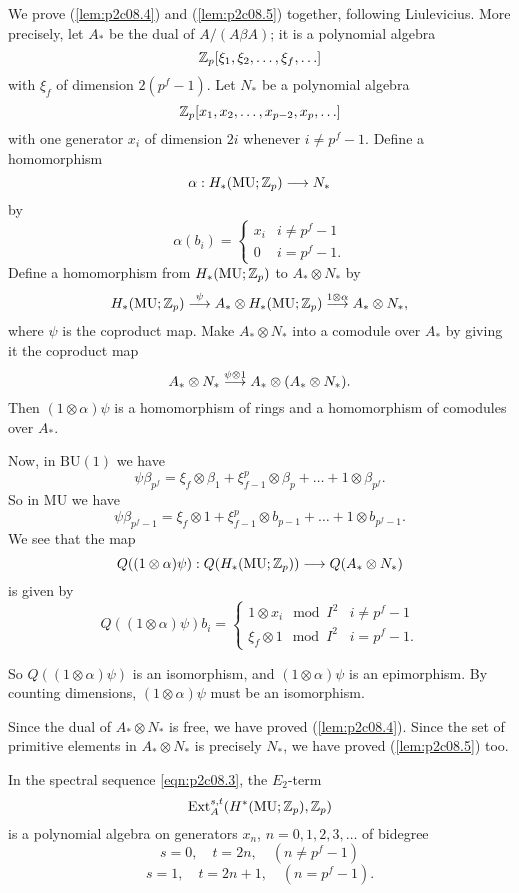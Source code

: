 \documentclass[../main]{subfiles}
\begin{document}
We prove (\ref{lem:p2c08.4}) and (\ref{lem:p2c08.5}) together, following Liulevicius. More precisely, let $A_\ast$ be the dual of $A/(A \beta A)$; it is a polynomial algebra $$\mathbb{Z}_p[\xi_1, \xi_2, \ldots, \xi_f, \ldots]$$ with $\xi_f$ of dimension $2(p^f - 1)$. Let $N_\ast$ be a polynomial algebra $$\mathbb{Z}_p[x_1, x_2, \ldots, x_{p - 2}, x_p, \ldots]$$ with one generator $x_i$ of dimension $2i$ whenever $i \ne p^f - 1$. Define a homomorphism $$\alpha : H_\ast(\mathrm{MU}; \mathbb{Z}_p) \overset{}{\longrightarrow} N_\ast$$ by $$\alpha(b_i) = \begin{cases}x_i & i \ne p^f - 1 \\ 0 & i = p^f - 1.\end{cases}$$ Define a homomorphism from $H_\ast(\mathrm{MU}; \mathbb{Z}_p)$ to $A_\ast \otimes N_\ast$ by $$H_\ast(\mathrm{MU}; \mathbb{Z}_p) \overset{\psi}{\longrightarrow} A_\ast \otimes H_\ast(\mathrm{MU}; \mathbb{Z}_p) \overset{1 \otimes \alpha}{\longrightarrow} A_\ast \otimes N_\ast,$$ where $\psi$ is the coproduct map. Make $A_\ast \otimes N_\ast$ into a comodule over $A_\ast$ by giving it the coproduct map $$A_\ast \otimes N_\ast \overset{\psi \otimes 1}{\longrightarrow} A_\ast \otimes (A_\ast \otimes N_\ast).$$ Then $(1 \otimes \alpha) \psi$ is a homomorphism of rings and a homomorphism of comodules over $A_\ast$.

Now, in $\mathrm{BU}(1)$ we have $$\psi \beta_{p^f} = \xi_f \otimes \beta_1 + \xi_{f-1}^p \otimes \beta_p + \ldots + 1 \otimes \beta_{p^f}.$$ So in $\mathrm{MU}$ we have $$\psi \beta_{p^f - 1} = \xi_f \otimes 1 + \xi_{f - 1}^p \otimes b_{p - 1} + \ldots + 1 \otimes b_{p^f - 1}.$$ We see that the map $$Q((1 \otimes \alpha) \psi) : Q(H_\ast(\mathrm{MU}; \mathbb{Z}_p)) \overset{}{\longrightarrow} Q(A_\ast \otimes N_\ast)$$ is given by $$Q((1 \otimes \alpha) \psi) b_i = \begin{cases}1 \otimes x_i \mod I^2 & i \ne p^f - 1 \\ \xi_f \otimes 1 \mod I^2 & i = p^f - 1.\end{cases}$$

So $Q((1 \otimes \alpha)\psi)$ is an isomorphism, and $(1 \otimes \alpha) \psi$ is an epimorphism. By counting dimensions, $(1 \otimes \alpha) \psi$ must be an isomorphism. 

Since the dual of $A_\ast \otimes N_\ast$ is free, we have proved (\ref{lem:p2c08.4}). Since the set of primitive elements in $A_\ast \otimes N_\ast$ is precisely $N_\ast$, we have proved (\ref{lem:p2c08.5}) too.

\begin{corollary}
\label{cor:p2c08.6}
In the spectral sequence \eqref{eqn:p2c08.3}, the $E_2$-term $$\mathrm{Ext}_A^{s, t} (H^\ast(\mathrm{MU}; \mathbb{Z}_p), \mathbb{Z}_p)$$ is a polynomial algebra on generators $x_n$, $n = 0, 1, 2, 3, \ldots$ of bidegree 
$$s = 0, \quad t = 2n, \quad (n \ne p^f - 1)$$
$$s = 1, \quad t = 2n + 1, \quad (n = p^f - 1).$$
\end{corollary}
\end{document}
